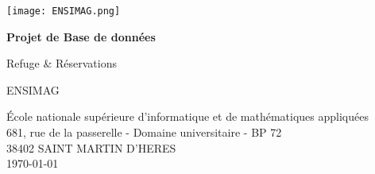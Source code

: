 \begin{titlepage}
    
    \texttt{[image: ENSIMAG.png]}\\[1cm] 
    \begin{center}
        \Huge
        \textbf{Projet de Base de données}
        
        \vspace{0.5cm}
        \LARGE
        Refuge \& Réservations %
        
        \vspace{1.5cm}
        

   		



       
        \vfill
        
        ENSIMAG
        
        \vspace{0.8cm}
          \Large
        École nationale supérieure d'informatique et de mathématiques appliquées\\
        681, rue de la passerelle - Domaine universitaire - BP 72\\
        38402 SAINT MARTIN D'HERES\\
       \today
        
    \end{center}
\end{titlepage}